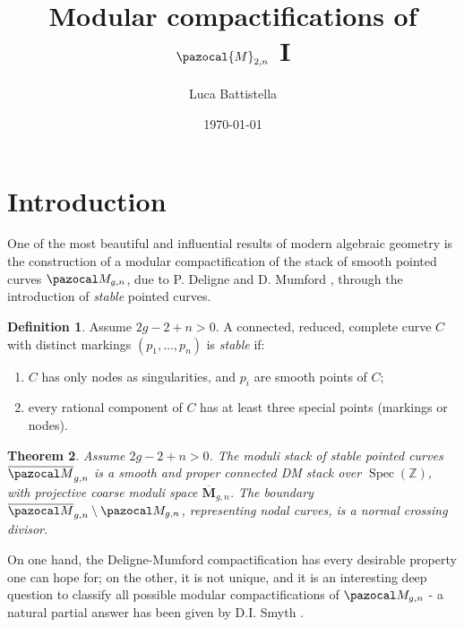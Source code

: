 \documentclass[11pt]{amsart}
\title{Modular compactifications of $\pazocal{M}_{2,n}$ I}
\author{Luca Battistella}
\date{\today}
\newcommand{\oM}{\overline{\pazocal M}}
\theoremstyle{plain}
\newtheorem{thm}{Theorem}[section]
\theoremstyle{definition}
\newtheorem{dfn}[thm]{Definition}
\begin{document}
\begin{abstract}


\end{abstract}

\maketitle
\tableofcontents

\section{Introduction}
One of the most beautiful and influential results of modern algebraic geometry is the construction of a modular compactification of the stack of smooth pointed curves $\pazocal M_{g,n}$, due to P. Deligne and D. Mumford \cite{DM}, through the introduction of \emph{stable} pointed curves.

\begin{dfn}
 Assume $2g-2+n>0$. A connected, reduced, complete curve $C$ with distinct markings $(p_1,\ldots,p_n)$ is \emph{stable} if:
 \begin{enumerate}
  \item $C$ has only nodes as singularities, and $p_i$ are smooth points of $C$;
  \item every rational component of $C$ has at least three special points (markings or nodes).
 \end{enumerate}
\end{dfn}

\begin{thm}
 Assume $2g-2+n>0$. The moduli stack of stable pointed curves $\oM_{g,n}$ is a smooth and proper connected DM stack over $\operatorname{Spec}(\mathbb Z)$, with projective coarse moduli space $\overline{\mathbf M}_{g,n}$. The boundary $\oM_{g,n}\setminus\pazocal M_{g,n}$, representing nodal curves, is a normal crossing divisor.
\end{thm}
On one hand, the Deligne-Mumford compactification has every desirable property one can hope for; on the other, it is not unique, and it is an interesting deep question to classify all possible modular compactifications of $\pazocal M_{g,n}$ - a natural partial answer has been given by D.I. Smyth \cite{SMY-towards}.
\end{document}
